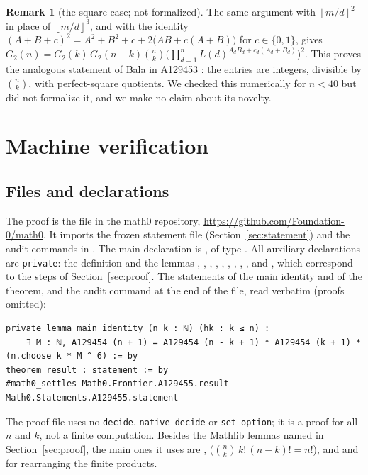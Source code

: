 \documentclass[11pt]{amsart}
\theoremstyle{plain}
\theoremstyle{definition}
\newtheorem{remark}[theorem]{Remark}
\newcommand{\fl}[1]{\left\lfloor #1\right\rfloor}
\begin{document}
\begin{remark}[the square case; not formalized]\label{rem:square}
The same argument with $\fl{m/d}^2$ in place of $\fl{m/d}^3$, and with the identity $(A+B+c)^2=A^2+B^2+c+2\bigl(AB+c(A+B)\bigr)$ for $c\in\{0,1\}$, gives $G_2(n)=G_2(k)\,G_2(n-k)\binom nk\bigl(\prod_{d=1}^nL(d)^{A_dB_d+c_d(A_d+B_d)}\bigr)^2$. This proves the analogous statement of Bala in A129453 \cite{A129453}: the entries are integers, divisible by $\binom nk$, with perfect-square quotients. We checked this numerically for $n<40$ but did not formalize it, and we make no claim about its novelty.
\end{remark}

\section{Machine verification}\label{sec:lean}

\subsection*{Files and declarations}
The proof is the file  in the math0 repository, \url{https://github.com/Foundation-0/math0}. It imports the frozen statement file  (Section~\ref{sec:statement}) and the audit commands in . The main declaration is , of type . All auxiliary declarations are \texttt{private}: the definition  and the lemmas , , , , , , , , ,  and , which correspond to the steps of Section~\ref{sec:proof}. The statements of the main identity and of the theorem, and the audit command at the end of the file, read verbatim (proofs omitted):
\begin{lstlisting}[basicstyle=\ttfamily\scriptsize]
private lemma main_identity (n k : ℕ) (hk : k ≤ n) :
    ∃ M : ℕ, A129454 (n + 1) = A129454 (n - k + 1) * A129454 (k + 1) * (n.choose k * M ^ 6) := by
theorem result : statement := by
#math0_settles Math0.Frontier.A129455.result Math0.Statements.A129455.statement
\end{lstlisting}
The proof file uses no \texttt{decide}, \texttt{native\_decide} or \texttt{set\_option}; it is a proof for all $n$ and $k$, not a finite computation. Besides the Mathlib lemmas named in Section~\ref{sec:proof}, the main ones it uses are ,  ($\binom nk\,k!\,(n-k)!=n!$), and  and  for rearranging the finite products.
\end{document}
